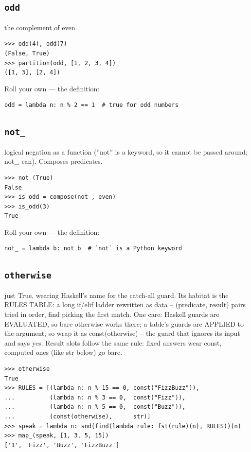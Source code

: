 \documentclass[10pt,letterpaper]{book}
\begin{document}
\subsection{\texttt{odd}}\label{def:odd}
the complement of even.
\begin{lstlisting}[style=ex]
>>> odd(4), odd(7)
(False, True)
>>> partition(odd, [1, 2, 3, 4])
([1, 3], [2, 4])
\end{lstlisting}

Roll your own --- the definition:

\begin{lstlisting}[style=ex]
odd = lambda n: n % 2 == 1  # true for odd numbers
\end{lstlisting}

\subsection{\texttt{not\_}}\label{def:not-}
logical negation as a function (''not'' is a keyword, so it cannot be passed around; not\_ can). Composes predicates.
\begin{lstlisting}[style=ex]
>>> not_(True)
False
>>> is_odd = compose(not_, even)
>>> is_odd(3)
True
\end{lstlisting}

Roll your own --- the definition:

\begin{lstlisting}[style=ex]
not_ = lambda b: not b  # `not` is a Python keyword
\end{lstlisting}

\subsection{\texttt{otherwise}}\label{def:otherwise}
just True, wearing Haskell's name for the catch-all guard. Its habitat is the RULES TABLE: a long if/elif ladder rewritten as data -- (predicate, result) pairs tried in order, find picking the first match. One care: Haskell guards are EVALUATED, so bare otherwise works there; a table's guards are APPLIED to the argument, so wrap it as const(otherwise) -- the guard that ignores its input and says yes. Result slots follow the same rule: fixed answers wear const, computed ones (like str below) go bare.
\begin{lstlisting}[style=ex]
>>> otherwise
True
>>> RULES = [(lambda n: n % 15 == 0, const("FizzBuzz")),
...          (lambda n: n % 3 == 0,  const("Fizz")),
...          (lambda n: n % 5 == 0,  const("Buzz")),
...          (const(otherwise),      str)]
>>> speak = lambda n: snd(find(lambda rule: fst(rule)(n), RULES))(n)
>>> map_(speak, [1, 3, 5, 15])
['1', 'Fizz', 'Buzz', 'FizzBuzz']
\end{lstlisting}
\end{document}
